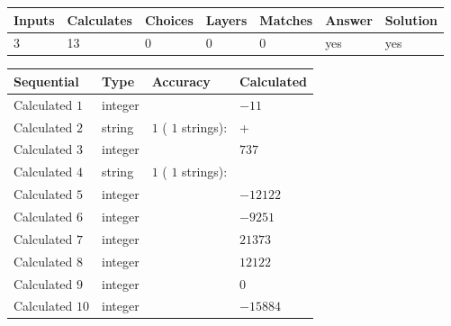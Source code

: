 \documentclass[12pt]{article}
\begin{document}
 
 
\noindent{}
 
 

 
\vspace{0.3in}
   
   
   
   
\noindent\begin{tabular}{|l|l|l|l|l|l|l|}
 \hline
Inputs & Calculates & Choices & Layers & Matches & Answer & Solution \\ \hline
           3  & 
          13  & 
           0
  & 
           0  & 
           0  & 
  yes & 
  yes 
  \\ \hline
 \end{tabular}
   
   
   
   
\noindent{}
   
   
  
  
\noindent\begin{tabular}{|l|l|l|l|}
\hline
 Sequential & Type & Accuracy & Calculated \\ 
\hline
 
 
  Calculated $            1 $ & integer &  & 
  $ -11 $ 
 \\  \hline  
 
 
  Calculated $            2 $ & string & $            1  $ ( $           1  $ strings): 
 & +
 \\  \hline  
 
 
  Calculated $            3 $ & integer &  & 
  $ 737 $ 
 \\  \hline  
 
 
  Calculated $            4 $ & string & $            1  $ ( $           1  $ strings): 
 & 
 \\  \hline  
 
 
  Calculated $            5 $ & integer &  & 
  $ -12122 $ 
 \\  \hline  
 
 
  Calculated $            6 $ & integer &  & 
  $ -9251 $ 
 \\  \hline  
 
 
  Calculated $            7 $ & integer &  & 
  $ 21373 $ 
 \\  \hline  
 
 
  Calculated $            8 $ & integer &  & 
  $ 12122 $ 
 \\  \hline  
 
 
  Calculated $            9 $ & integer &  & 
  $ 0 $ 
 \\  \hline  
 
 
  Calculated $           10 $ & integer &  & 
  $ -15884 $ 
 \\  \hline  
 \end{tabular}
   
\end{document}
